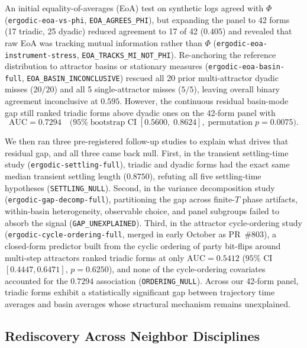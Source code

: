 \documentclass[11pt,a4paper]{article}
\begin{document}
An initial equality-of-averages (EoA) test on synthetic logs agreed with $\Phi$ (\texttt{ergodic-eoa-vs-phi}, \texttt{EOA\_AGREES\_PHI}), but expanding the panel to 42 forms (17 triadic, 25 dyadic) reduced agreement to 17 of 42 ($0.405$) and revealed that raw EoA was tracking mutual information rather than $\Phi$ (\texttt{ergodic-eoa-instrument-stress}, \texttt{EOA\_TRACKS\_MI\_NOT\_PHI}). Re-anchoring the reference distribution to attractor basins or stationary measures (\texttt{ergodic-eoa-basin-full}, \texttt{EOA\_BASIN\_INCONCLUSIVE}) rescued all 20 prior multi-attractor dyadic misses ($20/20$) and all 5 single-attractor misses ($5/5$), leaving overall binary agreement inconclusive at $0.595$. However, the continuous residual basin-mode gap still ranked triadic forms above dyadic ones on the 42-form panel with
\begin{equation}
  \mathrm{AUC} = 0.7294 \quad \bigl(95\%\;\text{bootstrap CI}\;[0.5600,\; 0.8624],\; \text{permutation}\; p = 0.0075\bigr). \label{eq:eoa_auc}
\end{equation}

We then ran three pre-registered follow-up studies to explain what drives that residual gap, and all three came back null. First, in the transient settling-time study (\texttt{ergodic-settling-full}), triadic and dyadic forms had the exact same median transient settling length ($0.8750$), refuting all five settling-time hypotheses (\texttt{SETTLING\_NULL}). Second, in the variance decomposition study (\texttt{ergodic-gap-decomp-full}), partitioning the gap across finite-$T$ phase artifacts, within-basin heterogeneity, observable choice, and panel subgroups failed to absorb the signal (\texttt{GAP\_UNEXPLAINED}). Third, in the attractor cycle-ordering study (\texttt{ergodic-cycle-ordering-full}, merged in early October as PR~\#803), a closed-form predictor built from the cyclic ordering of party bit-flips around multi-step attractors ranked triadic forms at only $\mathrm{AUC} = 0.5412$ ($95\%$ CI $[0.4447, 0.6471]$, $p = 0.6250$), and none of the cycle-ordering covariates accounted for the $0.7294$ association (\texttt{ORDERING\_NULL}). Across our 42-form panel, triadic forms exhibit a statistically significant gap between trajectory time averages and basin averages whose structural mechanism remains unexplained.

\subsection{Rediscovery Across Neighbor Disciplines}
\end{document}
